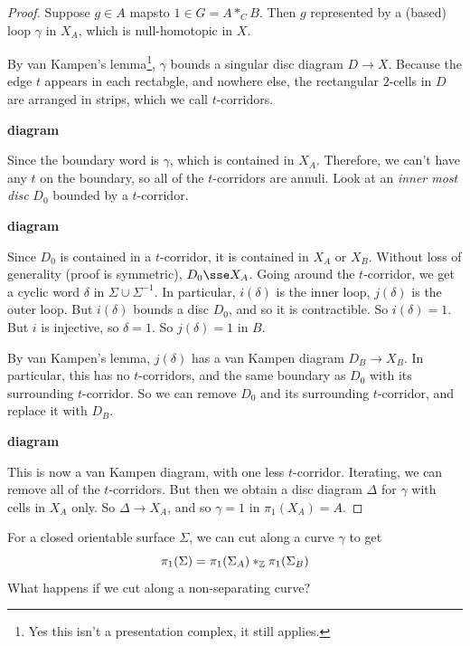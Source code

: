 \documentclass{article}
\begin{document}
\begin{proof}
    Suppose \(g \in A\) mapsto \(1 \in G = A *_C B\). Then \(g\) represented by a (based) loop \(\gamma\) in \(X_A\), which is null-homotopic in \(X\).

    By van Kampen's lemma\footnote{Yes this isn't a presentation complex, it still applies.}, \(\gamma\) bounds a singular disc diagram \(D \to X\). Because the edge \(t\) appears in each rectabgle, and nowhere else, the rectangular \(2\)-cells in \(D\) are arranged in strips, which we call \(t\)-corridors.

    \textbf{diagram}

    Since the boundary word is \(\gamma\), which is contained in \(X_A\). Therefore, we can't have any \(t\) on the boundary, so all of the \(t\)-corridors are annuli. Look at an \emph{inner most disc} \(D_0\) bounded by a \(t\)-corridor.

    \textbf{diagram}

    Since \(D_0\) is contained in a \(t\)-corridor, it is contained in \(X_A\) or \(X_B\). Without loss of generality (proof is symmetric), \(D_0 \sse X_A\). Going around the \(t\)-corridor, we get a cyclic word \(\delta\) in \(\Sigma \cup \Sigma^{-1}\). In particular, \(i(\delta)\) is the inner loop, \(j(\delta)\) is the outer loop. But \(i(\delta)\) bounds a disc \(D_0\), and so it is contractible. So \(i(\delta) = 1\). But \(i\) is injective, so \(\delta = 1\). So \(j(\delta) = 1\) in \(B\).

    By van Kampen's lemma, \(j(\delta)\) has a van Kampen diagram \(D_B \to X_B\). In particular, this has no \(t\)-corridors, and the same boundary as \(D_0\) with its surrounding \(t\)-corridor. So we can remove \(D_0\) and its surrounding \(t\)-corridor, and replace it with \(D_B\).

    \textbf{diagram}

    This is now a van Kampen diagram, with one less \(t\)-corridor. Iterating, we can remove all of the \(t\)-corridors. But then we obtain a disc diagram \(\Delta\) for \(\gamma\) with cells in \(X_A\) only. So \(\Delta \to X_A\), and so \(\gamma = 1\) in \(\pi_1(X_A) = A\).
\end{proof}

\begin{example}
    For a closed orientable surface \(\Sigma\), we can cut along a curve \(\gamma\) to get
    \[\pi_1(\Sigma) = \pi_1(\Sigma_A) *_{\mathbb{Z}} \pi_1(\Sigma_B)\]
    What happens if we cut along a non-separating curve?
\end{example}
\end{document}
